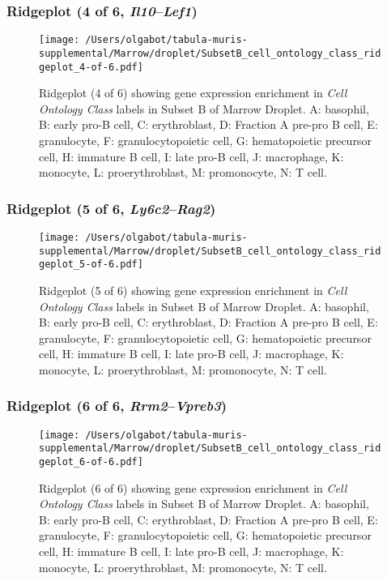 \clearpage

\subsubsection{Ridgeplot (4 of 6, \emph{Il10}--\emph{Lef1})}
\begin{figure}[h]
\centering
\texttt{[image: /Users/olgabot/tabula-muris-supplemental/Marrow/droplet/SubsetB\_cell\_ontology\_class\_ridgeplot\_4-of-6.pdf]}

\caption{ Ridgeplot (4 of 6)  showing gene expression enrichment in \emph{Cell Ontology Class} labels in Subset B of Marrow Droplet. A: basophil, B: early pro-B cell, C: erythroblast, D: Fraction A pre-pro B cell, E: granulocyte, F: granulocytopoietic cell, G: hematopoietic precursor cell, H: immature B cell, I: late pro-B cell, J: macrophage, K: monocyte, L: proerythroblast, M: promonocyte, N: T cell.}
\end{figure}


\clearpage

\subsubsection{Ridgeplot (5 of 6, \emph{Ly6c2}--\emph{Rag2})}
\begin{figure}[h]
\centering
\texttt{[image: /Users/olgabot/tabula-muris-supplemental/Marrow/droplet/SubsetB\_cell\_ontology\_class\_ridgeplot\_5-of-6.pdf]}

\caption{ Ridgeplot (5 of 6)  showing gene expression enrichment in \emph{Cell Ontology Class} labels in Subset B of Marrow Droplet. A: basophil, B: early pro-B cell, C: erythroblast, D: Fraction A pre-pro B cell, E: granulocyte, F: granulocytopoietic cell, G: hematopoietic precursor cell, H: immature B cell, I: late pro-B cell, J: macrophage, K: monocyte, L: proerythroblast, M: promonocyte, N: T cell.}
\end{figure}


\clearpage

\subsubsection{Ridgeplot (6 of 6, \emph{Rrm2}--\emph{Vpreb3})}
\begin{figure}[h]
\centering
\texttt{[image: /Users/olgabot/tabula-muris-supplemental/Marrow/droplet/SubsetB\_cell\_ontology\_class\_ridgeplot\_6-of-6.pdf]}

\caption{ Ridgeplot (6 of 6)  showing gene expression enrichment in \emph{Cell Ontology Class} labels in Subset B of Marrow Droplet. A: basophil, B: early pro-B cell, C: erythroblast, D: Fraction A pre-pro B cell, E: granulocyte, F: granulocytopoietic cell, G: hematopoietic precursor cell, H: immature B cell, I: late pro-B cell, J: macrophage, K: monocyte, L: proerythroblast, M: promonocyte, N: T cell.}
\end{figure}



